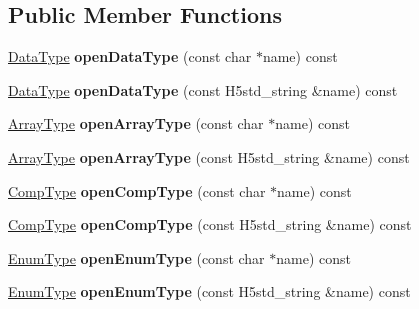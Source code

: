 \subsection*{Public Member Functions}
\begin{DoxyCompactItemize}
\item 
\mbox{\label{class_h5_1_1_common_f_g_a613dfbb09c4db06c0705e4d41debae2d}} 
\hyperlink{class_h5_1_1_data_type}{Data\+Type} {\bfseries open\+Data\+Type} (const char $\ast$name) const
\item 
\mbox{\label{class_h5_1_1_common_f_g_a68167212033619b310369523b3630ad2}} 
\hyperlink{class_h5_1_1_data_type}{Data\+Type} {\bfseries open\+Data\+Type} (const H5std\+\_\+string \&name) const
\item 
\mbox{\label{class_h5_1_1_common_f_g_a5940ab53b07119fda96517f22be2635e}} 
\hyperlink{class_h5_1_1_array_type}{Array\+Type} {\bfseries open\+Array\+Type} (const char $\ast$name) const
\item 
\mbox{\label{class_h5_1_1_common_f_g_ad32bfa20c7719b41f53e44120d0c2b93}} 
\hyperlink{class_h5_1_1_array_type}{Array\+Type} {\bfseries open\+Array\+Type} (const H5std\+\_\+string \&name) const
\item 
\mbox{\label{class_h5_1_1_common_f_g_a5b9654e5d21cfd32f605284c8c0dde10}} 
\hyperlink{class_h5_1_1_comp_type}{Comp\+Type} {\bfseries open\+Comp\+Type} (const char $\ast$name) const
\item 
\mbox{\label{class_h5_1_1_common_f_g_a9a627cffc4a9ab411b45ccf10a7ff4db}} 
\hyperlink{class_h5_1_1_comp_type}{Comp\+Type} {\bfseries open\+Comp\+Type} (const H5std\+\_\+string \&name) const
\item 
\mbox{\label{class_h5_1_1_common_f_g_a891656c02cf326edeadbfe67dafb41bc}} 
\hyperlink{class_h5_1_1_enum_type}{Enum\+Type} {\bfseries open\+Enum\+Type} (const char $\ast$name) const
\item 
\mbox{\label{class_h5_1_1_common_f_g_ac528db25b2903e98201e6de9a1a0743d}} 
\hyperlink{class_h5_1_1_enum_type}{Enum\+Type} {\bfseries open\+Enum\+Type} (const H5std\+\_\+string \&name) const

\end{DoxyCompactItemize}
